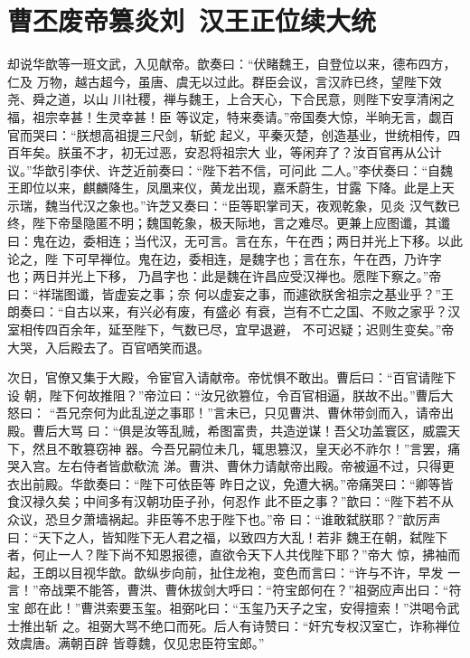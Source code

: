\chapter{曹丕废帝篡炎刘~汉王正位续大统}

却说华歆等一班文武，入见献帝。歆奏曰：“伏睹魏王，自登位以来，德布四方，仁及
万物，越古超今，虽唐、虞无以过此。群臣会议，言汉祚已终，望陛下效尧、舜之道，以山
川社稷，禅与魏王，上合天心，下合民意，则陛下安享清闲之福，祖宗幸甚！生灵幸甚！臣
等议定，特来奏请。”帝国奏大惊，半晌无言，觑百官而哭曰：“朕想高祖提三尺剑，斩蛇
起义，平秦灭楚，创造基业，世统相传，四百年矣。朕虽不才，初无过恶，安忍将祖宗大
业，等闲弃了？汝百官再从公计议。”华歆引李伏、许芝近前奏曰：“陛下若不信，可问此
二人。”李伏奏曰：“自魏王即位以来，麒麟降生，凤凰来仪，黄龙出现，嘉禾蔚生，甘露
下降。此是上天示瑞，魏当代汉之象也。”许芝又奏曰：“臣等职掌司天，夜观乾象，见炎
汉气数已终，陛下帝垦隐匿不明；魏国乾象，极天际地，言之难尽。更兼上应图谶，其谶
曰：鬼在边，委相连；当代汉，无可言。言在东，午在西；两日并光上下移。以此论之，陛
下可早禅位。鬼在边，委相连，是魏字也；言在东，午在西，乃许字也；两日并光上下移，
乃昌字也：此是魏在许昌应受汉禅也。愿陛下察之。”帝曰：“祥瑞图谶，皆虚妄之事；奈
何以虚妄之事，而遽欲朕舍祖宗之基业乎？”王朗奏曰：“自古以来，有兴必有废，有盛必
有衰，岂有不亡之国、不败之家乎？汉室相传四百余年，延至陛下，气数已尽，宜早退避，
不可迟疑；迟则生变矣。”帝大哭，入后殿去了。百官哂笑而退。

次日，官僚又集于大殿，令宦官入请献帝。帝忧惧不敢出。曹后曰：“百官请陛下设
朝，陛下何故推阻？”帝泣曰：“汝兄欲篡位，令百官相逼，朕故不出。”曹后大怒曰：
“吾兄奈何为此乱逆之事耶！”言未已，只见曹洪、曹休带剑而入，请帝出殿。曹后大骂
曰：“俱是汝等乱贼，希图富贵，共造逆谋！吾父功盖寰区，威震天下，然且不敢篡窃神
器。今吾兄嗣位未几，辄思篡汉，皇天必不祚尔！”言罢，痛哭入宫。左右侍者皆歔欷流
涕。曹洪、曹休力请献帝出殿。帝被逼不过，只得更衣出前殿。华歆奏曰：“陛下可依臣等
昨日之议，免遭大祸。”帝痛哭曰：“卿等皆食汉禄久矣；中间多有汉朝功臣子孙，何忍作
此不臣之事？”歆曰：“陛下若不从众议，恐旦夕萧墙祸起。非臣等不忠于陛下也。”帝
曰：“谁敢弑朕耶？”歆厉声曰：“天下之人，皆知陛下无人君之福，以致四方大乱！若非
魏王在朝，弑陛下者，何止一人？陛下尚不知恩报德，直欲令天下人共伐陛下耶？”帝大
惊，拂袖而起，王朗以目视华歆。歆纵步向前，扯住龙袍，变色而言曰：“许与不许，早发
一言！”帝战栗不能答，曹洪、曹休拔剑大呼曰：“符宝郎何在？”祖弼应声出曰：“符宝
郎在此！”曹洪索要玉玺。祖弼叱曰：“玉玺乃天子之宝，安得擅索！”洪喝令武士推出斩
之。祖弼大骂不绝口而死。后人有诗赞曰：“奸宄专权汉室亡，诈称禅位效虞唐。满朝百辟
皆尊魏，仅见忠臣符宝郎。”

